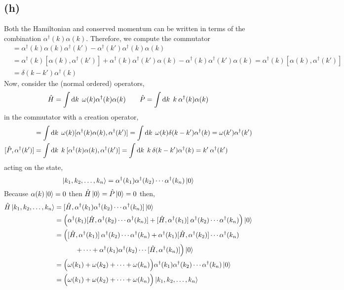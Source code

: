\documentclass[12pt]{extarticle}
\begin{document}
\subsection*{(h)}
Both the Hamiltonian and conserved momentum can be written in terms of the combination $\alpha^\dagger(k) \alpha(k)$. Therefore, we compute the commutator
\begin{align*}
[\alpha^\dagger(k) \alpha(k), \alpha^\dagger(k')] & = \alpha^\dagger(k) \alpha(k) \alpha^\dagger(k') - \alpha^\dagger(k') \alpha^\dagger(k) \alpha(k)
\\
& = \alpha^\dagger(k) [\alpha(k), \alpha^\dagger(k')] + \alpha^\dagger(k) \alpha^\dagger(k') \alpha(k) - \alpha^\dagger(k) \alpha^\dagger(k') \alpha(k) = \alpha^\dagger(k) [\alpha(k), \alpha^\dagger(k')] 
\\
& = \delta(k - k') \alpha^\dagger(k)
\end{align*}
Now, consider the (normal ordered) operators,
\[ \hat{H} = \int \mathrm{d}k \: \: \omega(k) \alpha^\dagger(k) \alpha(k) \quad \quad \hat{P} = \int \mathrm{d}k \: \: k \: \alpha^\dagger(k) \alpha(k) \]
in the commutator with a creation operator,
\begin{align*}
[\hamilt, \alpha^\dagger(k')] & = \int \d{k} \: \omega(k) [\alpha^\dagger(k) \alpha(k), \alpha^\dagger(k')] = \int \d{k} \: \omega(k) \delta(k - k') \alpha^\dagger(k) = \omega(k') \alpha^\dagger(k') 
\\
[\hat{P}, \alpha^\dagger(k')] & = \int \d{k} \: k \: [\alpha^\dagger(k) \alpha(k), \alpha^\dagger(k')] = \int \d{k} \: k \: \delta(k - k') \alpha^\dagger(k) = k' \: \alpha^\dagger(k') 
\end{align*}
acting on the state,
\[ \left| k_1, k_2, \dots, k_n \right> = \alpha^\dagger(k_1) \alpha^\dagger(k_2) \cdots \alpha^\dagger(k_n) \left| 0 \right> \]
Because $\alpha(k) \left| 0 \right> = 0$ then $\hat{H} \left| 0 \right> = \hat{P} \left| 0 \right> = 0$ then,
\begin{align*}
\hat{H} \left| k_1, k_2, \dots, k_n \right> & = [\hat{H}, \alpha^\dagger(k_1) \alpha^\dagger(k_2) \cdots \alpha^\dagger(k_n)] \left| 0 \right> 
\\
& = \left( \alpha^\dagger(k_1) [\hat{H}, \alpha^\dagger(k_2) \cdots \alpha^\dagger(k_n)]   + [\hat{H}, \alpha^\dagger(k_1)] \: \alpha^\dagger(k_2) \cdots \alpha^\dagger(k_n) \right) \left| 0 \right> 
\\
& = \left([\hat{H}, \alpha^\dagger(k_1)] \: \alpha^\dagger(k_2) \cdots \alpha^\dagger(k_n) + \alpha^\dagger(k_1) [\hat{H}, \alpha^\dagger(k_2)] \cdots \alpha^\dagger(k_n) \right. \\ 
& \left. \quad \quad \quad + \cdots +  \alpha^\dagger(k_1) \alpha^\dagger(k_2) \cdots [\hat{H}, \alpha^\dagger(k_n)] \right) \left| 0 \right> 
\\ 
& = \Big( \omega(k_1) + \omega(k_2) + \cdots + \omega(k_n) \Big) \alpha^\dagger(k_1) \alpha^\dagger(k_2) \cdots \alpha^\dagger(k_n) \left| 0 \right> 
\\
& = \Big( \omega(k_1) + \omega(k_2) + \cdots + \omega(k_n) \Big) \left| k_1, k_2, \dots, k_n \right>
\end{align*}
\end{document}
